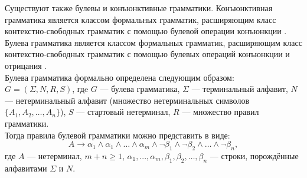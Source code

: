 \documentclass{spbau-diploma}
\begin{document}
Существуют также булевы и конъюнктивные грамматики.  Конъюнктивная грамматика является классом формальных грамматик, расширяющим класс контекстно-свободных грамматик с помощью булевой операции конъюнкции \cite{conjunctive}. Булева грамматика является классом формальных грамматик, расширяющим класс контекстно-свободных грамматик с помощью булевых операций конъюнкции и отрицания \cite{boolean}.
\\Булева грамматика формально определена следующим образом:
\\$G = (\Sigma, N, R, S)$, гдe $G$ --- булева грамматика, $\Sigma$ --- терминальный алфавит, $N$ --- нетерминальный алфавит (множество
нетерминальных символов $\{A_1, A_2, … , A_n\}$), $S$ --- стартовый
нетерминал, $R$ --- множество правил грамматики.
\\Тогда правила булевой грамматики можно представить в виде:
\begin{equation}
A \rightarrow \alpha_1 \wedge  \alpha_1 \wedge … \wedge  \alpha_m \wedge \neg \beta_1 \wedge \neg \beta_2 \wedge … \wedge \neg \beta_n,
\end{equation}
где $A$ --- нетерминал, $m + n \ge 1$, $\alpha_1, ..., \alpha_m , \beta_1,\beta_2, … , \beta_n$ --- строки, порождённые алфавитами $\Sigma$ и $N$.
\end{document}
